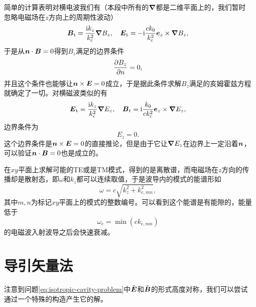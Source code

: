 简单的计算表明对横电波我们有（本段中所有的$\grad$都是二维平面上的，我们暂时忽略电磁场在$z$方向上的周期性波动）
\begin{equation}
    \vb*{B}_\text{t} = \frac{\mathrm{i} k_z}{k_\text{c}^2} \grad{B_z}, \quad \vb*{E}_\text{t} = - \mathrm{i} \frac{c k_0}{k_\text{c}^2} \vb*{e}_z \times \grad{B_z},
\end{equation}
于是从$\vb*{n} \cdot \vb*{B} = 0$得到$B_z$满足的边界条件
\begin{equation}
    \pdv{B_z}{n} = 0,
\end{equation}
并且这个条件也能够让$\vb*{n} \times \vb*{E} = 0$成立，于是据此条件求解$B_z$满足的亥姆霍兹方程就确定了一切。对横磁波类似的有
\begin{equation}
    \vb*{E}_\text{t} = \frac{\mathrm{i} k_z}{k_\text{c}^2} \grad{E_z}, \quad \vb*{B}_\text{t} = \mathrm{i} \frac{k_0}{ck_\text{c}^2} \vb*{e}_z \times \grad{E_z},
\end{equation}
边界条件为
\begin{equation}
    E_z = 0.
\end{equation}
这个边界条件是$\vb*{n} \times \vb*{E}=0$的直接推论，但是由于它让$\grad{E_z}$在边界上一定沿着$\vb*{n}$，可以验证$\vb*{n} \cdot \vb*{B}=0$也是成立的。

在$xy$平面上求解可能的TE或是TM模式，得到的是离散谱，而电磁场在$z$方向的传播却是散射态，即$\omega$和$k_z$都可以连续取值，于是波导内的模式的能谱形如
\begin{equation}
    \omega = c \sqrt{k_z^2 + k_{\text{c}, mn}^2},
\end{equation}
其中$m, n$为标记$xy$平面上的模式的整数编号。可以看到这个能谱是有能隙的，能量低于
\begin{equation}
    \omega_\text{c} = \min (c k_{\text{c}, mn})
\end{equation}
的电磁波入射波导之后会快速衰减。

\section{导引矢量法}

注意到问题\eqref{eq:isotropic-cavity-problem}中$\tilde{\vb*{E}}$和$\tilde{\vb*{B}}$的形式高度对称，我们可以尝试通过一个特殊的构造产生它的解。

